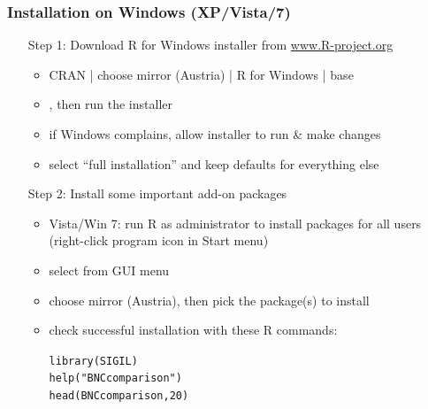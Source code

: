 \documentclass[t]{beamer} %
\begin{document}
\begin{frame}[fragile]
  \frametitle{Installation on Windows (XP/Vista/7)}
  
  \begin{itemize}
  \item[Step 1:] Download R for Windows installer from \url{www.R-project.org}
    \begin{itemize}
    \item CRAN | choose mirror (Austria) | R for Windows | base
    \item {}, then run the installer
    \item if Windows complains, allow installer to run \& make changes
    \item select ``full installation'' and keep defaults for everything else
    \item[]
    \end{itemize}
    \pause
  \item[Step 2:] Install some important add-on packages
    \begin{itemize}
    \item Vista/Win 7: run R as administrator to install packages for all
      users (right-click program icon in Start menu)
    \item select  from GUI menu
    \item choose mirror (Austria), then pick the package(s) to install
    \item check successful installation with these R commands:
      \begin{scriptsize}
        \begin{alltt}
library(SIGIL)
help("BNCcomparison") 
head(BNCcomparison, 20)
        \end{alltt}
      \end{scriptsize}
    \end{itemize}
  \end{itemize}
\end{frame}
\end{document}
